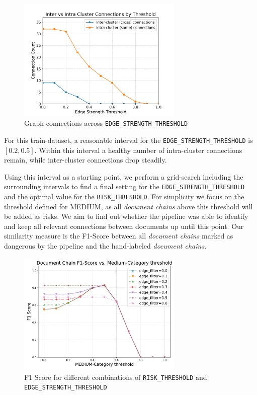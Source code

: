 \begin{figure}[h]
    \centering
    \includegraphics[width=0.7\textwidth]{figures/c2_cluster_connections_counts.pdf}
    \caption{Graph connections across \texttt{EDGE\_STRENGTH\_THRESHOLD}}
    \label{approach-fig:strength_connection_counts}
\end{figure}

For this train-dataset, a reasonable interval for the \texttt{EDGE\_STRENGTH\_THRESHOLD} is $[0.2,0.5]$. Within this interval a healthy number of intra-cluster connections remain, while inter-cluster connections drop steadily.

Using this interval as a starting point, we perform a grid-search including the surrounding intervals to find a final setting for the \texttt{EDGE\_STRENGTH\_THRESHOLD} and the optimal value for the \texttt{RISK\_THRESHOLD}. For simplicity we focus on the threshold defined for MEDIUM, as all \textit{document chains} above this threshold will be added as risks. We aim to find out whether the pipeline was able to identify and keep all relevant connections between documents up until this point. Our similarity measure is the F1-Score between all \textit{document chains} marked as dangerous by the pipeline and the hand-labeled \textit{document chains}.

\begin{figure}[h]
    \centering
    \includegraphics[width=0.7\textwidth]{figures/c2_f1_comparison.pdf}
    \caption{F1 Score for different combinations of \texttt{RISK\_THRESHOLD} and \texttt{EDGE\_STRENGTH\_THRESHOLD}}
    \label{approach-fig:f1_chain_score}
\end{figure}

